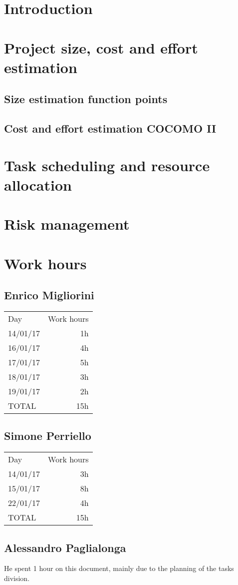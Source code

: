 \section{Introduction}



\clearpage
\section{Project size, cost and effort estimation}\label{sec:project-size,-cost-and-effort-estimation}
\subsection{Size estimation function points}\label{sec:function-points}


\clearpage
\subsection{Cost and effort estimation COCOMO II}\label{sec:cocomo}


\clearpage
\section{Task scheduling and resource allocation}\label{sec:task-scheduling}


\clearpage
\section{Risk management}\label{sec:risk-management}


\section{Work hours}
\subsection{Enrico Migliorini}
\begin{tabular}{l r}
	Day & Work hours \\
	14/01/17 & 1h \\
	16/01/17 & 4h \\
	17/01/17 & 5h \\
	18/01/17 & 3h \\
	19/01/17 & 2h \\ \hline
	TOTAL & 15h
\end{tabular}

\subsection{Simone Perriello}
\begin{tabular}{l r}
	Day & Work hours \\
	14/01/17 & 3h \\
	15/01/17 & 8h \\ \hline
	22/01/17 & 4h \\ \hline
	TOTAL & 15h \\
\end{tabular}

\subsection{Alessandro Paglialonga}
He spent 1 hour on this document, mainly due to the planning of the tasks division.